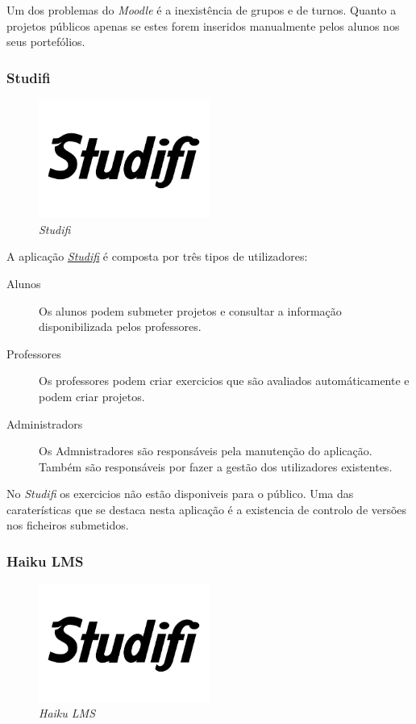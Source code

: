Um dos problemas do \emph{Moodle} é a inexistência de grupos e de turnos. Quanto a projetos públicos apenas se estes forem inseridos manualmente pelos alunos nos seus portefólios.

\subsubsection{Studifi} %
\label{ssub:studifi}

\begin{figure}[H]
        \centering
        \includegraphics[width=0.5\textwidth]{images/concorrencia/studifi.png}
         \caption{\emph{Studifi}}
         \label{fig: studifi}
\end{figure}

A aplicação \href{https://studifi.com/}{\emph{Studifi}} é composta por três tipos de utilizadores:

\begin{description}
	\item[Alunos] Os alunos podem submeter projetos e consultar a informação disponibilizada pelos professores.
	\item[Professores] Os professores podem criar exercicios que são avaliados automáticamente e podem criar projetos.
	\item[Administradors] Os Admnistradores são responsáveis pela manutenção do aplicação. Também são responsáveis por fazer a gestão dos utilizadores existentes.
\end{description}

No \emph{Studifi} os exercicios não estão disponiveis para o público. Uma das caraterísticas que se destaca nesta aplicação é a existencia de controlo de versões nos ficheiros submetidos.


\subsubsection{Haiku LMS} %
\label{ssub:haiku_lms}

\begin{figure}[H]
        \centering
        \includegraphics[width=0.5\textwidth]{images/concorrencia/studifi.png}
         \caption{\emph{Haiku LMS}}
         \label{fig: studifi}
\end{figure}

